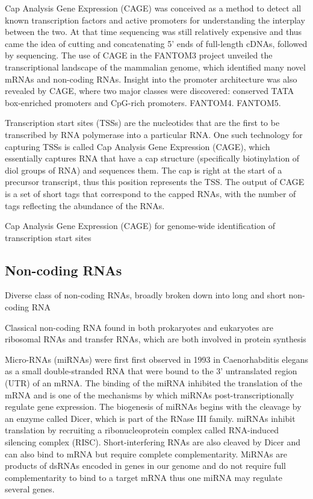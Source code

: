 Cap Analysis Gene Expression (CAGE) was conceived as a method to detect all known transcription factors and active promoters for understanding the interplay between the two\cite{carninci2010capanalysis}. At that time sequencing was still relatively expensive and thus came the idea of cutting and concatenating 5' ends of full-length cDNAs, followed by sequencing. The use of CAGE in the FANTOM3 project unveiled the transcriptional landscape of the mammalian genome\cite{pmid16141072}, which identified many novel mRNAs and non-coding RNAs. Insight into the promoter architecture was also revealed by CAGE, where two major classes were discovered: conserved TATA box-enriched promoters and CpG-rich promoters\cite{pmid16645617}. FANTOM4\cite{pmid19377474}. FANTOM5\cite{pmid24670764}.

Transcription start sites (TSSs) are the nucleotides that are the first to be transcribed by RNA polymerase into a particular RNA. One such technology for capturing TSSs is called Cap Analysis Gene Expression (CAGE), which essentially captures RNA that have a cap structure (specifically biotinylation of diol groups of RNA\cite{pmid8938445}) and sequences them. The cap is right at the start of a precursor transcript, thus this position represents the TSS. The output of CAGE is a set of short tags that correspond to the capped RNAs, with the number of tags reflecting the abundance of the RNAs.

Cap Analysis Gene Expression (CAGE) for genome-wide identification of transcription start sites

\subsection{Non-coding RNAs}

Diverse class of non-coding RNAs, broadly broken down into long and short non-coding RNA

Classical non-coding RNA found in both prokaryotes and eukaryotes are ribosomal RNAs and transfer RNAs, which are both involved in protein synthesis

Micro-RNAs (miRNAs) were first first observed in 1993 in Caenorhabditis elegans\cite{pmid8252621} as a small double-stranded RNA that were bound to the 3' untranslated region (UTR) of an mRNA. The binding of the miRNA inhibited the translation of the mRNA and is one of the mechanisms by which miRNAs post-transcriptionally regulate gene expression. The biogenesis of miRNAs begins with the cleavage by an enzyme called Dicer\cite{pmid11201747}, which is part of the RNase III family. miRNAs inhibit translation by recruiting a ribonucleoprotein complex called RNA-induced silencing complex (RISC). Short-interfering RNAs are also cleaved by Dicer and can also bind to mRNA but require complete complementarity. MiRNAs are products of dsRNAs encoded in genes in our genome and do not require full complementarity to bind to a target mRNA thus one miRNA may regulate several genes.

